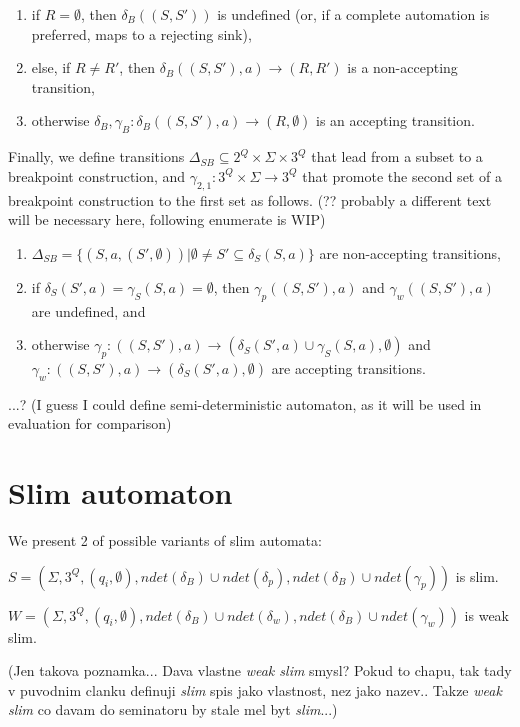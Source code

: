\documentclass[
	digital
nolof, nolot
]{fithesis3}
\begin{document}
			\begin{enumerate}
				\item if $R=\emptyset$, then $\delta_B((S,S'))$ is undefined (or, if a complete automation is preferred, maps to a rejecting sink),
				\item else, if $R \neq R'$, then $\delta_B((S,S'),a)\rightarrow(R, R')$ is a non-accepting transition,
				\item otherwise $\delta_B, \gamma_B: \delta_B((S,S'),a)\rightarrow(R, \emptyset)$ is an accepting transition.
			\end{enumerate}
		
			Finally, we define transitions $\Delta_{SB}\subseteq 2^Q \times \Sigma \times 3^Q$ that lead from a subset to a breakpoint construction, and $\gamma_{2,1}:3^Q \times \Sigma \rightarrow 3^Q$ that promote the second set of a breakpoint construction to the first set as follows. (?? probably a different text will be necessary here, following enumerate is WIP)
			
			\begin{enumerate}
				\item $\Delta_{SB}=\{(S, a, (S', \emptyset)) | \emptyset \neq S' \subseteq \delta_S(S, a)\}$ are non-accepting transitions,
				\item if $\delta_S(S',a) = \gamma_S(S, a) = \emptyset$, then $\gamma_{p}((S,S'), a)$ and $\gamma_{w}((S,S'), a)$ are undefined, and
				\item otherwise
				 $\gamma_{p}:((S,S'),a)\rightarrow(\delta_S(S',a)\cup\gamma_S(S, a),\emptyset)$ and $\gamma_{w}:((S,S'),a)\rightarrow(\delta_S(S',a),\emptyset)$ are accepting transitions.
			\end{enumerate}
		
			...? (I guess I could define semi-deterministic automaton, as it will be used in evaluation for comparison)
			\section{Slim automaton}
			We present 2 of possible variants of slim automata:
			
			$S=(\Sigma, 3^Q, (q_i,\emptyset), ndet(\delta_B)\cup ndet(\delta_{p}),ndet(\delta_B)\cup ndet(\gamma_{p}))$ is slim.
			
			$W=(\Sigma, 3^Q, (q_i,\emptyset), ndet(\delta_B)\cup ndet(\delta_{w}),ndet(\delta_B)\cup ndet(\gamma_{w}))$ is weak slim. 
			
			(Jen takova poznamka... Dava vlastne \emph{weak slim} smysl? Pokud to chapu, tak tady v puvodnim clanku definuji \emph{slim} spis jako vlastnost, nez jako nazev.. Takze \emph{weak slim} co davam do seminatoru by stale mel byt \emph{slim}...)
			
\end{document}
